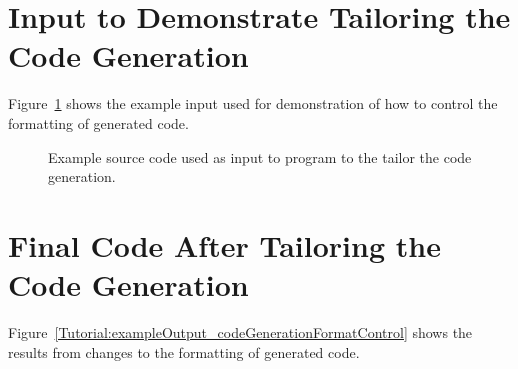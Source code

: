 \section{Input to Demonstrate Tailoring the Code Generation}

   Figure~\ref{Tutorial:exampleInputCode_codeGenerationFormatControl}
shows the example input used for demonstration of how to control the formatting 
of generated code.

\begin{figure}[!h]
{\indent
{\mySmallFontSize

\begin{latexonly}
   
\end{latexonly}

\begin{htmlonly}
   
\end{htmlonly}

}
}
\caption{Example source code used as input to program to the tailor the code generation.}
\label{Tutorial:exampleInputCode_codeGenerationFormatControl}
\end{figure}





\section{Final Code After Tailoring the Code Generation}

   Figure~\ref{Tutorial:exampleOutput_codeGenerationFormatControl} 
shows the results from changes to the formatting of generated code.


